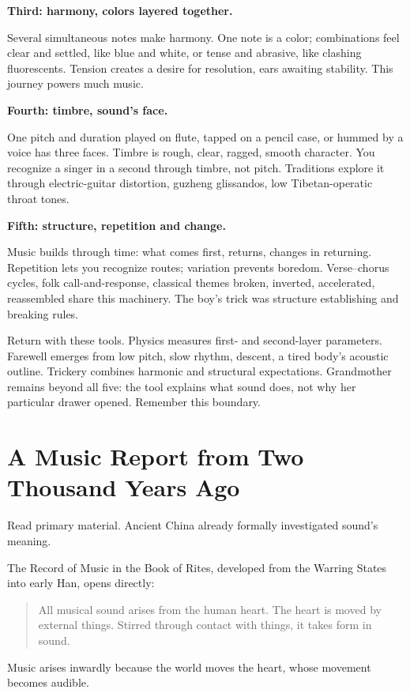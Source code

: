 \textbf{Third: harmony, colors layered together.}

Several simultaneous notes make harmony. One note is a color; combinations feel clear and settled, like blue and white, or tense and abrasive, like clashing fluorescents. Tension creates a desire for resolution, ears awaiting stability. This journey powers much music.

\textbf{Fourth: timbre, sound's face.}

One pitch and duration played on flute, tapped on a pencil case, or hummed by a voice has three faces. Timbre is rough, clear, ragged, smooth character. You recognize a singer in a second through timbre, not pitch. Traditions explore it through electric-guitar distortion, guzheng glissandos, low Tibetan-operatic throat tones.

\textbf{Fifth: structure, repetition and change.}

Music builds through time: what comes first, returns, changes in returning. Repetition lets you recognize routes; variation prevents boredom. Verse--chorus cycles, folk call-and-response, classical themes broken, inverted, accelerated, reassembled share this machinery. The boy's trick was structure establishing and breaking rules.

Return with these tools. Physics measures first- and second-layer parameters. Farewell emerges from low pitch, slow rhythm, descent, a tired body's acoustic outline. Trickery combines harmonic and structural expectations. Grandmother remains beyond all five: the tool explains what sound does, not why her particular drawer opened. Remember this boundary.

\section[An Ancient Report on Music]{A Music Report from Two Thousand Years Ago}
Read primary material. Ancient China already formally investigated sound's meaning.

The Record of Music in the Book of Rites, developed from the Warring States into early Han, opens directly:

\begin{quote}
All musical sound arises from the human heart. The heart is moved by external things. Stirred through contact with things, it takes form in sound.
\end{quote}
Music arises inwardly because the world moves the heart, whose movement becomes audible.

